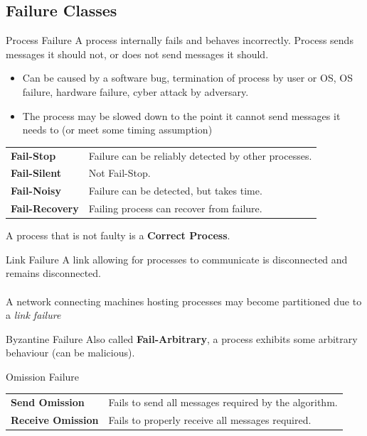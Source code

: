 \subsection{Failure Classes}
\begin{definitionbox}{Process Failure}
    A process internally fails and behaves incorrectly. Process sends messages it should not, or does not send messages it should.
    \begin{itemize}
        \item Can be caused by a software bug, termination of process by user or OS, OS failure, hardware failure, cyber attack by adversary.
        \item The process may be slowed down to the point it cannot send messages it needs to (or meet some timing assumption)
    \end{itemize}
    \begin{center}
        \begin{tabular}{l l}
            \textbf{Fail-Stop} & Failure can be reliably detected by other processes. \\
            \textbf{Fail-Silent} & Not Fail-Stop. \\
            \textbf{Fail-Noisy} & Failure can be detected, but takes time. \\
            \textbf{Fail-Recovery} & Failing process can recover from failure. \\
        \end{tabular}
    \end{center}
    A process that is not faulty is a \textbf{Correct Process}. 
\end{definitionbox}


\begin{tcbraster}[raster columns=2, raster equal height]
    \begin{definitionbox}{Link Failure}
        A link allowing for processes to communicate is disconnected and remains disconnected.
        \\
        \\ A network connecting machines hosting processes may become partitioned due to a \textit{link failure}
    \end{definitionbox}
    \begin{definitionbox}{Byzantine Failure}
        Also called \textbf{Fail-Arbitrary}, a process exhibits some arbitrary behaviour (can be malicious).
    \end{definitionbox}
\end{tcbraster}
\begin{definitionbox}{Omission Failure}
    \begin{center}
        \begin{tabular}{l l}
            \textbf{Send Omission} & Fails to send all messages required by the algorithm. \\
            \textbf{Receive Omission} & Fails to properly receive all messages required. \\
        \end{tabular}
    \end{center}
\end{definitionbox}

